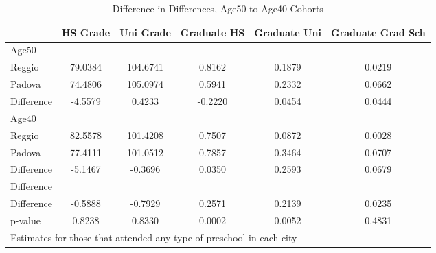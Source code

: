 \begin{table}[htbp]\centering
\caption{Difference in Differences, Age50 to Age40 Cohorts}
\begin{tabular}{l*{5}{c}}
\hline\hline
            &    HS Grade&   Uni Grade& Graduate HS&Graduate Uni&Graduate Grad Sch\\
\hline
Age50       &            &            &            &            &            \\
Reggio      &     79.0384&    104.6741&      0.8162&      0.1879&      0.0219\\
Padova      &     74.4806&    105.0974&      0.5941&      0.2332&      0.0662\\
Difference  &     -4.5579&      0.4233&     -0.2220&      0.0454&      0.0444\\
\hline
Age40       &            &            &            &            &            \\
Reggio      &     82.5578&    101.4208&      0.7507&      0.0872&      0.0028\\
Padova      &     77.4111&    101.0512&      0.7857&      0.3464&      0.0707\\
Difference  &     -5.1467&     -0.3696&      0.0350&      0.2593&      0.0679\\
\hline
Difference  &            &            &            &            &            \\
Difference  &     -0.5888&     -0.7929&      0.2571&      0.2139&      0.0235\\
p-value     &      0.8238&      0.8330&      0.0002&      0.0052&      0.4831\\
\hline\hline
\multicolumn{6}{l}{\footnotesize Estimates for those that attended any type of preschool in each city}\\
\end{tabular}
\end{table}
